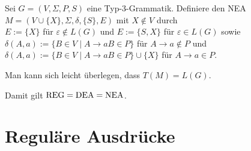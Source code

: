 \begin{Beweis}
    Sei $G = (V, \Sigma, P, S)$ eine Typ-3-Grammatik.
    Definiere den NEA\\
    $M = (V \cup \{X\}, \Sigma, \delta, \{S\}, E)$ mit $X \notin V$ durch\\
    $E := \{X\}$ für $\varepsilon \notin L(G)$ und
    $E := \{S, X\}$ für $\varepsilon \in L(G)$ sowie\\
    $\delta(A, a) := \{B \in V \;|\; A \rightarrow aB \in P\}$ für
    $A \rightarrow a \notin P$ und\\
    $\delta(A, a) := \{B \in V \;|\; A \rightarrow aB \in P\} \cup \{X\}$ für
    $A \rightarrow a \in P$.

    Man kann sich leicht überlegen, dass $T(M) = L(G)$.
\end{Beweis}

\begin{Bem}
    Damit gilt $\text{REG} = \text{DEA} = \text{NEA}$.
\end{Bem}

\pagebreak

\section{%
    Reguläre Ausdrücke%
}

